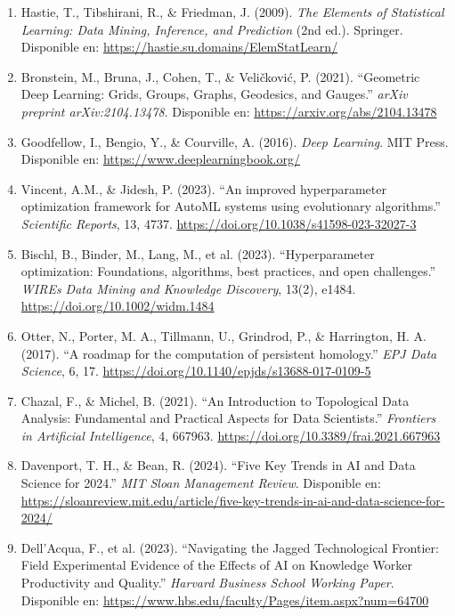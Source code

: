 \documentclass[11pt]{article}
\begin{document}
\begin{enumerate}
	\item Hastie, T., Tibshirani, R., \& Friedman, J. (2009). \textit{The Elements of Statistical Learning: Data Mining, Inference, and Prediction} (2nd ed.). Springer. Disponible en: \url{https://hastie.su.domains/ElemStatLearn/}

	\item Bronstein, M., Bruna, J., Cohen, T., \& Veli\v{c}kovi\'c, P. (2021). ``Geometric Deep Learning: Grids, Groups, Graphs, Geodesics, and Gauges.'' \textit{arXiv preprint arXiv:2104.13478}. Disponible en: \url{https://arxiv.org/abs/2104.13478}

	\item Goodfellow, I., Bengio, Y., \& Courville, A. (2016). \textit{Deep Learning}. MIT Press. Disponible en: \url{https://www.deeplearningbook.org/}

	\item Vincent, A.M., \& Jidesh, P. (2023). ``An improved hyperparameter optimization framework for AutoML systems using evolutionary algorithms.'' \textit{Scientific Reports}, 13, 4737. \url{https://doi.org/10.1038/s41598-023-32027-3}

	\item Bischl, B., Binder, M., Lang, M., et al. (2023). ``Hyperparameter optimization: Foundations, algorithms, best practices, and open challenges.'' \textit{WIREs Data Mining and Knowledge Discovery}, 13(2), e1484. \url{https://doi.org/10.1002/widm.1484}

	\item Otter, N., Porter, M. A., Tillmann, U., Grindrod, P., \& Harrington, H. A. (2017). ``A roadmap for the computation of persistent homology.'' \textit{EPJ Data Science}, 6, 17. \url{https://doi.org/10.1140/epjds/s13688-017-0109-5}

	\item Chazal, F., \& Michel, B. (2021). ``An Introduction to Topological Data Analysis: Fundamental and Practical Aspects for Data Scientists.'' \textit{Frontiers in Artificial Intelligence}, 4, 667963. \url{https://doi.org/10.3389/frai.2021.667963}

	\item Davenport, T. H., \& Bean, R. (2024). ``Five Key Trends in AI and Data Science for 2024.'' \textit{MIT Sloan Management Review}. Disponible en: \url{https://sloanreview.mit.edu/article/five-key-trends-in-ai-and-data-science-for-2024/}

	\item Dell'Acqua, F., et al. (2023). ``Navigating the Jagged Technological Frontier: Field Experimental Evidence of the Effects of AI on Knowledge Worker Productivity and Quality.'' \textit{Harvard Business School Working Paper}. Disponible en: \url{https://www.hbs.edu/faculty/Pages/item.aspx?num=64700}


\end{enumerate}
\end{document}

